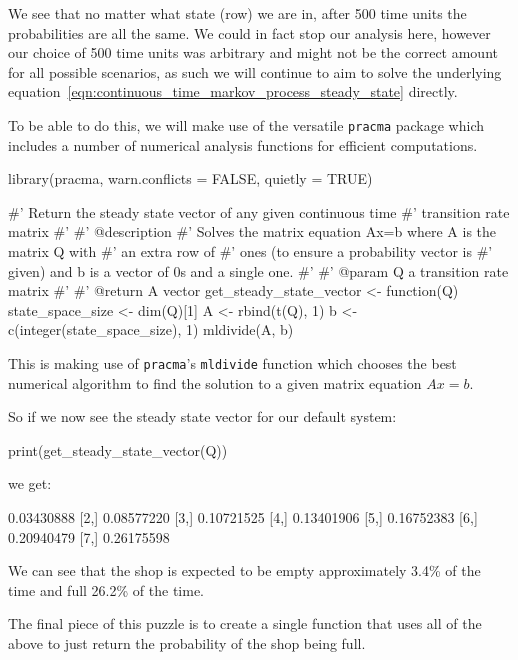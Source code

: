 We see that no matter what state (row) we are in, after 500 time units the
probabilities are all the same. We could in fact stop our analysis here, however
our choice of 500 time units was arbitrary and might not be the correct amount
for all possible scenarios, as such we will continue to aim to solve the
underlying equation~\ref{eqn:continuous_time_markov_process_steady_state}
directly.

To be able to do this, we will make use of the versatile \texttt{pracma}
package which includes a number of numerical analysis functions for efficient
computations.

\begin{Rin}
library(pracma, warn.conflicts = FALSE, quietly = TRUE)

#' Return the steady state vector of any given continuous time
#' transition rate matrix
#'
#' @description
#' Solves the matrix equation Ax=b where A is the matrix Q with
#' an extra row of #' ones (to ensure a probability vector is
#' given) and b is a vector of 0s and a single one.
#'
#' @param Q a transition rate matrix
#'
#' @return A vector
get_steady_state_vector <- function(Q){
  state_space_size <- dim(Q)[1]
  A <- rbind(t(Q), 1)
  b <- c(integer(state_space_size), 1)
  mldivide(A, b)
}
\end{Rin}

This is making use of \texttt{pracma}'s \texttt{mldivide} function
which chooses the best numerical algorithm to find the solution to a given
matrix equation \(Ax=b\).

So if we now see the steady state vector for our default system:

\begin{Rin}
print(get_steady_state_vector(Q))
\end{Rin}

we get:

\begin{Rout}
           [,1]
[1,] 0.03430888
[2,] 0.08577220
[3,] 0.10721525
[4,] 0.13401906
[5,] 0.16752383
[6,] 0.20940479
[7,] 0.26175598
\end{Rout}

We can see that the shop is expected to be empty approximately 3.4\% of the time
and full 26.2\% of the time.

The final piece of this puzzle is to create a single function that uses all of
the above to just return the probability of the shop being full.

